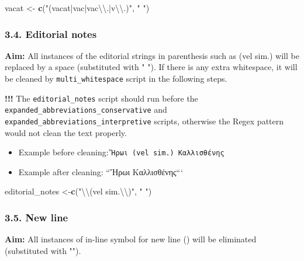 \documentclass[]{article}
\newenvironment{Shaded}{\begin{snugshade}}{\end{snugshade}}
\newcommand{\CharTok}[1]{\textcolor[rgb]{0.31,0.60,0.02}{#1}}
\newcommand{\KeywordTok}[1]{\textcolor[rgb]{0.13,0.29,0.53}{\textbf{#1}}}
\newcommand{\NormalTok}[1]{#1}
\newcommand{\StringTok}[1]{\textcolor[rgb]{0.31,0.60,0.02}{#1}}
\providecommand{\tightlist}{%
  \setlength{\itemsep}{0pt}\setlength{\parskip}{0pt}}
\begin{document}
\begin{Shaded}
\begin{Highlighting}[]
\NormalTok{vacat <-}\StringTok{ }\KeywordTok{c}\NormalTok{(}\StringTok{"(vacat|vac|vac}\CharTok{\textbackslash{}\textbackslash{}}\StringTok{.|v}\CharTok{\textbackslash{}\textbackslash{}}\StringTok{.)"}\NormalTok{, }\StringTok{" "}\NormalTok{)}
\end{Highlighting}
\end{Shaded}

\hypertarget{editorial-notes}{%
\subsubsection{3.4. Editorial notes}\label{editorial-notes}}

\textbf{Aim:} All instances of the editorial strings in parenthesis such
as (vel sim.) will be replaced by a space (substituted with " "). If
there is any extra whitespace, it will be cleaned by
\texttt{multi\_whitespace} script in the following steps.

\textbf{!!!} The \texttt{editorial\_notes} script should run before the
\texttt{expanded\_abbreviations\_conservative} and
\texttt{expanded\_abbreviations\_interpretive} scripts, otherwise the
Regex pattern would not clean the text properly.

\begin{itemize}
\tightlist
\item
  Example before cleaning: \texttt{Ἥρωι\ (vel\ sim.)\ Καλλισθένης}
\item
  Example after cleaning: ``Ἥρωι Καλλισθένης```
\end{itemize}

\begin{Shaded}
\begin{Highlighting}[]
\NormalTok{editorial_notes <-}\KeywordTok{c}\NormalTok{(}\StringTok{"}\CharTok{\textbackslash{}\textbackslash{}}\StringTok{(vel sim.}\CharTok{\textbackslash{}\textbackslash{}}\StringTok{)"}\NormalTok{, }\StringTok{" "}\NormalTok{)}
\end{Highlighting}
\end{Shaded}

\hypertarget{new-line}{%
\subsubsection{3.5. New line}\label{new-line}}

\textbf{Aim:} All instances of in-line symbol for new line (\textbar{})
will be eliminated (substituted with "").
\end{document}

